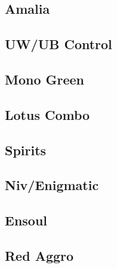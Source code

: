 \documentclass[12pt]{article}
\begin{document}
\subsection{Amalia}

\subsection{UW/UB Control}

\subsection{Mono Green}

\subsection{Lotus Combo}

\subsection{Spirits}

\subsection{Niv/Enigmatic}

\subsection{Ensoul}

\subsection{Red Aggro}
\end{document}
